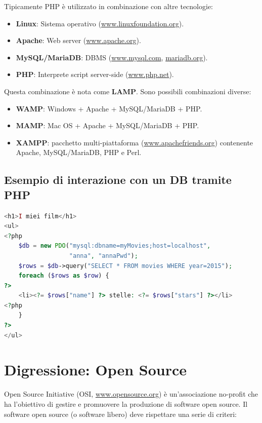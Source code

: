 Tipicamente PHP è utilizzato in combinazione con altre tecnologie:

\begin{itemize}
    \item \textbf{Linux}: Sistema operativo (\url{www.linuxfoundation.org}).
    \item \textbf{Apache}: Web server (\url{www.apache.org}).
    \item \textbf{MySQL/MariaDB}: DBMS (\url{www.mysql.com}, \url{mariadb.org}).
    \item \textbf{PHP}: Interprete script server-side (\url{www.php.net}).
\end{itemize}

Questa combinazione è nota come \textbf{LAMP}. Sono possibili combinazioni diverse:

\begin{itemize}
    \item \textbf{WAMP}: Windows + Apache + MySQL/MariaDB + PHP.
    \item \textbf{MAMP}: Mac OS + Apache + MySQL/MariaDB + PHP.
    \item \textbf{XAMPP}: pacchetto multi-piattaforma (\url{www.apachefriends.org}) contenente Apache, MySQL/MariaDB, PHP e Perl.
\end{itemize}

\subsection{Esempio di interazione con un DB tramite PHP}

\begin{lstlisting}[language=PHP]
<h1>I miei film</h1>
<ul>
<?php
    $db = new PDO("mysql:dbname=myMovies;host=localhost",
                  "anna", "annaPwd");
    $rows = $db->query("SELECT * FROM movies WHERE year=2015");
    foreach ($rows as $row) {
?>
    <li><?= $rows["name"] ?> stelle: <?= $rows["stars"] ?></li>
<?php
    }
?>
</ul>
\end{lstlisting}

\section{Digressione: Open Source}

Open Source Initiative (OSI, \url{www.opensource.org}) è un'associazione no-profit che ha l'obiettivo di gestire e promuovere la produzione di software open source. Il software open source (o software libero) deve rispettare una serie di criteri:

